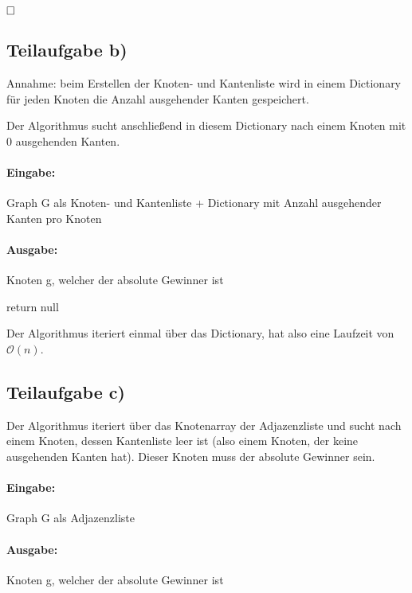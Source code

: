 \documentclass[12pt]{scrartcl}%
\theoremstyle{nonumberplain}
\newcommand{\bO}[1]{\mathcal O(#1)}
\begin{document}
$\hfill \square$

\subsection*{Teilaufgabe b)}

Annahme: beim Erstellen der Knoten- und Kantenliste wird in einem Dictionary für jeden Knoten die Anzahl ausgehender Kanten gespeichert. 

Der Algorithmus sucht anschließend in diesem Dictionary nach einem Knoten mit 0 ausgehenden Kanten.

\paragraph{Eingabe:} Graph G als Knoten- und Kantenliste + Dictionary mit Anzahl ausgehender Kanten pro Knoten

\paragraph{Ausgabe:} Knoten g, welcher der absolute Gewinner ist

\begin{algorithm}
	 {
	}
	return null\;
\end{algorithm}

Der Algorithmus iteriert einmal über das Dictionary, hat also eine Laufzeit von $\bO{n}$.

\subsection*{Teilaufgabe c)}

Der Algorithmus iteriert über das Knotenarray der Adjazenzliste und sucht nach einem Knoten, dessen Kantenliste leer ist (also einem Knoten, der keine ausgehenden Kanten hat). Dieser Knoten muss der absolute Gewinner sein.

\paragraph{Eingabe:} Graph G als Adjazenzliste

\paragraph{Ausgabe:} Knoten g, welcher der absolute Gewinner ist
\end{document}
